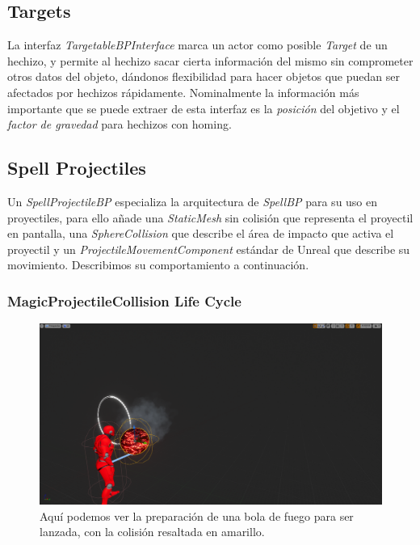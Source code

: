 \documentclass[12pt]{report}
\begin{document}
\subsection{Targets}

La interfaz \textit{\emph{TargetableBPInterface}} marca un actor como posible \textit{Target} de un hechizo, y permite al hechizo sacar cierta información del mismo sin comprometer otros datos del objeto, dándonos flexibilidad para hacer objetos que puedan ser afectados por hechizos rápidamente. Nominalmente la información más importante que se puede extraer de esta interfaz es la \textit{posición} del objetivo y el \textit{factor de gravedad} para hechizos con homing.

\subsection{Spell Projectiles}

Un \textit{\emph{SpellProjectileBP}} especializa la arquitectura de \textit{\emph{SpellBP}} para su uso en proyectiles, para ello añade una \textit{StaticMesh} sin colisión que representa el proyectil en pantalla, una \textit{SphereCollision} que describe el área de impacto que activa el proyectil y un \textit{ProjectileMovementComponent} estándar de Unreal que describe su movimiento. Describimos su comportamiento a continuación.

\subsubsection{MagicProjectileCollision Life Cycle}

\begin{figure}[H]
    \centering
    \includegraphics[width=1\textwidth]{fireball_ready_to_launch}
	\captionsetup{labelformat=empty}
    \caption{Aquí podemos ver la preparación de una bola de fuego para ser lanzada, con la colisión resaltada en amarillo.}
\end{figure}
\end{document}
